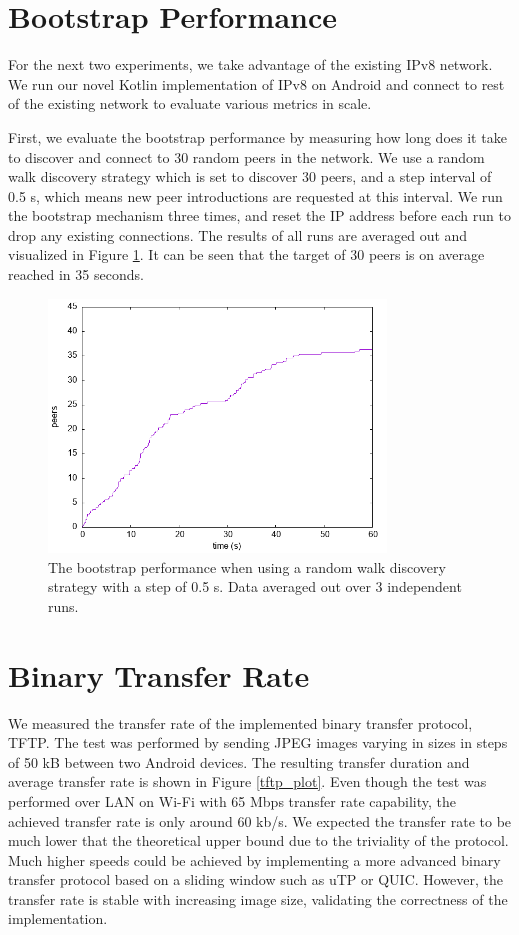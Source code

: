 \section{Bootstrap Performance}

For the next two experiments, we take advantage of the existing IPv8 network. We run our novel Kotlin implementation of IPv8 on Android and connect to rest of the existing network to evaluate various metrics in scale.

First, we evaluate the bootstrap performance by measuring how long does it take to discover and connect to 30 random peers in the network. We use a random walk discovery strategy which is set to discover 30 peers, and a step interval of 0.5 s, which means new peer introductions are requested at this interval. We run the bootstrap mechanism three times, and reset the IP address before each run to drop any existing connections. The results of all runs are averaged out and visualized in Figure \ref{bootstrap_performance}. It can be seen that the target of 30 peers is on average reached in 35 seconds.

\begin{figure}[h!]
    \centering
    \includegraphics[width=0.8\textwidth]{plots/bootstrap}
    \caption{The bootstrap performance when using a random walk discovery strategy with a step of 0.5 s. Data averaged out over 3 independent runs.}
    \label{bootstrap_performance}
\end{figure}

\section{Binary Transfer Rate}

We measured the transfer rate of the implemented binary transfer protocol, TFTP. The test was performed by sending JPEG images varying in sizes in steps of 50 kB between two Android devices. The resulting transfer duration and average transfer rate is shown in Figure \ref{tftp_plot}. Even though the test was performed over LAN on Wi-Fi with 65 Mbps transfer rate capability, the achieved transfer rate is only around 60 kb/s. We expected the transfer rate to be much lower that the theoretical upper bound due to the triviality of the protocol. Much higher speeds could be achieved by implementing a more advanced binary transfer protocol based on a sliding window such as uTP or QUIC. However, the transfer rate is stable with increasing image size, validating the correctness of the implementation.

